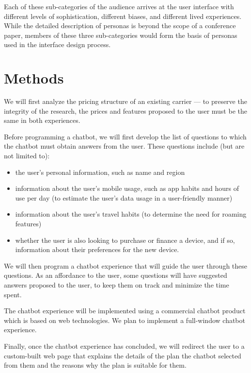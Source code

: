 \documentclass[conference]{IEEEtran}
\begin{document}
Each of these sub-categories of the audience arrives at the user interface
with different levels of sophistication, different biases, and different lived
experiences. While the detailed description of personas is beyond the scope of
a conference paper, members of these three sub-categories would form the basis
of personas used in the interface design process.

\section{Methods}

We will first analyze the pricing structure of an existing carrier --- to
preserve the integrity of the research, the prices and features proposed to the
user must be the same in both experiences.

Before programming a chatbot, we will first develop the list of questions to
which the chatbot must obtain answers from the user. These questions include
(but are not limited to):

\begin{itemize}
    \item the user's personal information, such as name and region
    \item information about the user's mobile usage, such as app habits and
          hours of use per day (to estimate the user's data usage in a
          user-friendly manner)
    \item information about the user's travel habits (to determine the need
          for roaming features)
    \item whether the user is also looking to purchase or finance a device,
          and if so, information about their preferences for the new device.
\end{itemize}

We will then program a chatbot experience that will guide the user through
these questions. As an affordance to the user, some questions will have suggested
answers proposed to the user, to keep them on track and minimize the time spent.

The chatbot experience will be implemented using a commercial chatbot product
which is based on web technologies. We plan to implement a full-window chatbot
experience.

Finally, once the chatbot experience has concluded, we will redirect the user
to a custom-built web page that explains the details of the plan the chatbot
selected from them and the reasons why the plan is suitable for them.
\end{document}
